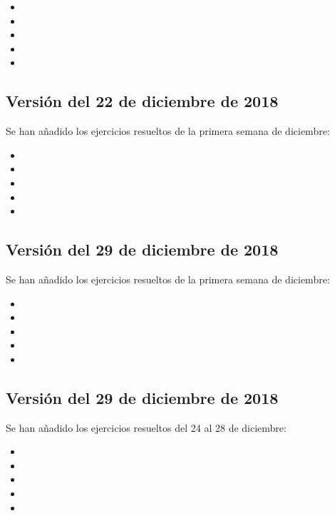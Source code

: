 \documentclass[a4paper,12pt,twoside]{book}
\begin{document}
\begin{itemize}
\item {}
\item {}
\item {}
\item {}
\item {}
\end{itemize}
     
\subsection*{Versión del 22 de diciembre de 2018}

Se han añadido los ejercicios resueltos de la primera semana de
diciembre:

\begin{itemize}
\item {}
\item {}
\item {}
\item {}
\item {}
\end{itemize}
     
\subsection*{Versión del 29 de diciembre de 2018}

Se han añadido los ejercicios resueltos de la primera semana de
diciembre:

\begin{itemize}
\item {}
\item {}
\item {}
\item {}
\item {}
\end{itemize}
     
\subsection*{Versión del 29 de diciembre de 2018}

Se han añadido los ejercicios resueltos del 24 al 28 de
diciembre:

\begin{itemize}
\item {}
\item {}
\item {}
\item {}
\item {}
\end{itemize}
     
\end{document}
